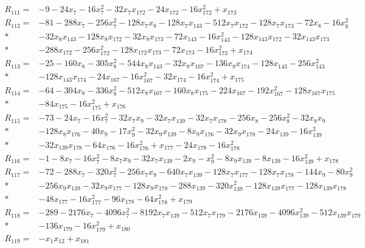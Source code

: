 \begin{align*}
R_{111}={}&-9-24x_{7}-16x_{7}^{2}-32x_{7}x_{172}-24x_{172}-16x_{172}^{2}+x_{173}\\[3pt]
R_{112}={}&-81-288x_{7}-256x_{7}^{2}-128x_{7}x_{8}-128x_{7}x_{143}-512x_{7}x_{172}-128x_{7}x_{173}-72x_{8}-16x_{8}^{2}\\*
&-32x_{8}x_{143}-128x_{8}x_{172}-32x_{8}x_{173}-72x_{143}-16x_{143}^{2}-128x_{143}x_{172}-32x_{143}x_{173}\\*
&-288x_{172}-256x_{172}^{2}-128x_{172}x_{173}-72x_{173}-16x_{173}^{2}+x_{174}\\[3pt]
R_{113}={}&-25-160x_{8}-305x_{8}^{2}-544x_{8}x_{143}-32x_{8}x_{167}-136x_{8}x_{174}-128x_{143}-256x_{143}^{2}\\*
&-128x_{143}x_{174}-24x_{167}-16x_{167}^{2}-32x_{174}-16x_{174}^{2}+x_{175}\\[3pt]
R_{114}={}&-64-304x_{8}-336x_{8}^{2}-512x_{8}x_{167}-160x_{8}x_{175}-224x_{167}-192x_{167}^{2}-128x_{167}x_{175}\\*
&-84x_{175}-16x_{175}^{2}+x_{176}\\[3pt]
R_{115}={}&-73-24x_{7}-16x_{7}^{2}-32x_{7}x_{9}-32x_{7}x_{139}-32x_{7}x_{178}-256x_{8}-256x_{8}^{2}-32x_{8}x_{9}\\*
&-128x_{8}x_{176}-40x_{9}-17x_{9}^{2}-32x_{9}x_{139}-8x_{9}x_{176}-32x_{9}x_{178}-24x_{139}-16x_{139}^{2}\\*
&-32x_{139}x_{178}-64x_{176}-16x_{176}^{2}+x_{177}-24x_{178}-16x_{178}^{2}\\[3pt]
R_{116}={}&-1-8x_{7}-16x_{7}^{2}-8x_{7}x_{9}-32x_{7}x_{139}-2x_{9}-x_{9}^{2}-8x_{9}x_{139}-8x_{139}-16x_{139}^{2}+x_{178}\\[3pt]
R_{117}={}&-72-288x_{7}-320x_{7}^{2}-256x_{7}x_{9}-640x_{7}x_{139}-128x_{7}x_{177}-128x_{7}x_{178}-144x_{9}-80x_{9}^{2}\\*
&-256x_{9}x_{139}-32x_{9}x_{177}-128x_{9}x_{178}-288x_{139}-320x_{139}^{2}-128x_{139}x_{177}-128x_{139}x_{178}\\*
&-48x_{177}-16x_{177}^{2}-96x_{178}-64x_{178}^{2}+x_{179}\\[3pt]
R_{118}={}&-289-2176x_{7}-4096x_{7}^{2}-8192x_{7}x_{139}-512x_{7}x_{179}-2176x_{139}-4096x_{139}^{2}-512x_{139}x_{179}\\*
&-136x_{179}-16x_{179}^{2}+x_{180}\\[3pt]
R_{119}={}&-x_{1}x_{12}+x_{181}\\[3pt]

\end{align*}
